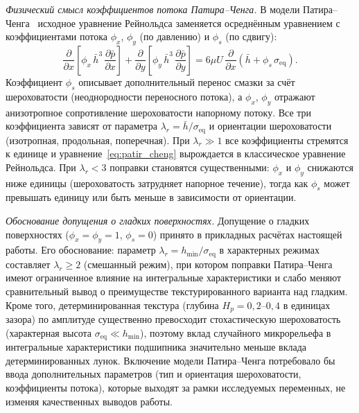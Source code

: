 \textit{Физический смысл коэффициентов потока Патира--Ченга.}
В модели Патира--Ченга~\cite{patir1978} исходное уравнение
Рейнольдса заменяется осреднённым уравнением с коэффициентами
потока $\phi_x$, $\phi_y$ (по давлению) и $\phi_s$ (по сдвигу):
%
\begin{equation}
  \frac{\partial}{\partial x}\!\left[\phi_x\,\bar{h}^3\,
  \frac{\partial \bar{p}}{\partial x}\right]
  + \frac{\partial}{\partial y}\!\left[\phi_y\,\bar{h}^3\,
  \frac{\partial \bar{p}}{\partial y}\right]
  = 6\mu U\,\frac{\partial}{\partial x}\!\left(\bar{h}
  + \phi_s\,\sigma_{\mathrm{eq}}\right).
  \label{eq:patir_cheng}
\end{equation}
%
Коэффициент $\phi_s$ описывает дополнительный перенос смазки
за счёт шероховатости (неоднородности переносного потока),
а $\phi_x$, $\phi_y$ отражают анизотропное сопротивление
шероховатости напорному потоку. Все три коэффициента зависят
от параметра $\lambda_r = \bar{h}/\sigma_{\mathrm{eq}}$
и ориентации шероховатости (изотропная, продольная,
поперечная). При $\lambda_r \gg 1$ все коэффициенты стремятся
к единице и уравнение~\eqref{eq:patir_cheng} вырождается
в классическое уравнение Рейнольдса.
При $\lambda_r < 3$ поправки становятся существенными:
$\phi_x$ и $\phi_y$ снижаются ниже единицы (шероховатость
затрудняет напорное течение), тогда как $\phi_s$ может
превышать единицу или быть меньше в зависимости от ориентации.

\textit{Обоснование допущения о гладких поверхностях.}
Допущение о гладких поверхностях ($\phi_x = \phi_y = 1$,
$\phi_s = 0$) принято в прикладных расчётах настоящей работы.
Его обоснование: параметр
$\lambda_r = h_{\min}/\sigma_{\mathrm{eq}}$ в характерных
режимах составляет $\lambda_r \geq 2$ (смешанный режим),
при котором поправки Патира--Ченга имеют ограниченное влияние
на интегральные характеристики и слабо меняют сравнительный
вывод о преимуществе текстурированного варианта над гладким.
Кроме того, детерминированная текстура (глубина
$H_p = 0{,}2$--$0{,}4$ в единицах зазора) по амплитуде
существенно превосходит стохастическую шероховатость
(характерная высота
$\sigma_{\mathrm{eq}} \ll h_{\min}$), поэтому вклад
случайного микрорельефа в интегральные характеристики
подшипника значительно меньше вклада детерминированных лунок.
Включение модели Патира--Ченга потребовало бы ввода
дополнительных параметров (тип и ориентация шероховатости,
коэффициенты потока), которые выходят за рамки исследуемых
переменных, не изменяя качественных выводов работы.
